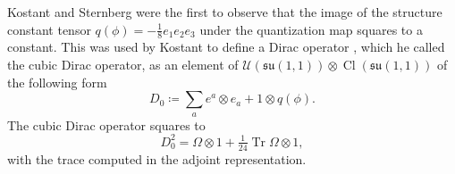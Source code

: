 \documentclass{amsart}
\theoremstyle{definition}
\theoremstyle{remark}
\DeclareMathOperator{\Cl}{Cl}
\DeclareMathOperator{\Tr}{Tr}
\numberwithin{equation}{section}
\begin{document}
Kostant and Sternberg \cite{kostant_sternberg_1987} were the first to observe that the image of the structure constant tensor $q(\phi)=-\tfrac{1}{8}e_1e_2e_3$ under the quantization map squares to a constant. This was used by Kostant to define a Dirac operator \cite{kostant_1999}, which he called the cubic Dirac operator, as an element of $\mathcal{U}(\mathfrak{su}(1,1))\otimes\Cl(\mathfrak{su}(1,1))$ of the following form
\begin{equation}\label{eq_cubic_dirac}
    D_0\coloneq\sum_{a}e^a\otimes e_a+1\otimes q(\phi).
\end{equation}
The cubic Dirac operator squares to
\begin{equation*}
    D_0^2=\Omega\otimes 1+\tfrac{1}{24}\Tr\Omega\otimes 1,
\end{equation*}
with the trace computed in the adjoint representation.
\end{document}
